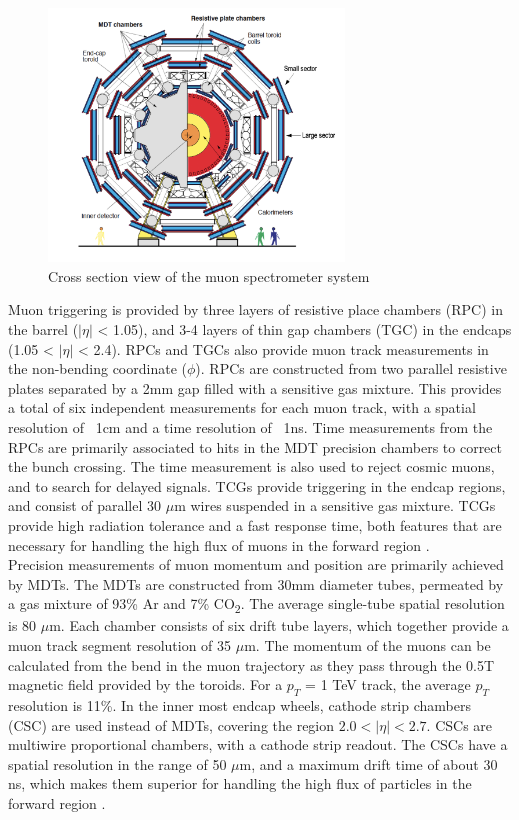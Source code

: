 \begin{figure}
        \centering
	\includegraphics[width=0.7\textwidth]{figures/ch3/muonSpec.png}
	\caption{Cross section view of the muon spectrometer system \cite{muon_tdr} }
	\label{fig:muonSpec}
\end{figure}
Muon triggering is provided by three layers of resistive place chambers (RPC) in the barrel ($|\eta|$ < 1.05), and 3-4 layers of thin gap chambers (TGC) in the endcaps (1.05 < $|\eta|$ < 2.4). RPCs and TGCs also provide muon track measurements in the non-bending coordinate ($\phi$). RPCs are constructed from two parallel resistive plates separated by a 2mm gap filled with a sensitive gas mixture. This provides a total of six independent measurements for each muon track, with a spatial resolution of ~1cm and a time resolution of ~1ns. Time measurements from the RPCs are primarily associated to hits in the MDT precision chambers to correct the bunch crossing. The time measurement is also used to reject cosmic muons, and to search for delayed signals. TCGs provide triggering in the endcap regions, and consist of parallel 30 $\mu$m wires suspended in a sensitive gas mixture. TCGs provide high radiation tolerance and a fast response time, both features that are necessary for handling the high flux of muons in the forward region \cite{muon_tdr}.\\

Precision measurements of muon momentum and position are primarily achieved by MDTs. The MDTs are constructed from 30mm diameter tubes, permeated by a gas mixture of 93\% Ar and 7\% CO\textsubscript{2}. The average single-tube spatial resolution is 80 $\mu$m. Each chamber consists of six drift tube layers, which together provide a muon track segment resolution of 35 $\mu$m. The momentum of the muons can be calculated from the bend in the muon trajectory as they pass through the 0.5T magnetic field provided by the toroids. For a $p_T$ = 1 TeV track, the average $p_T$ resolution is 11\%. In the inner most endcap wheels, cathode strip chambers (CSC) are used instead of MDTs, covering the region $2.0 < |\eta| < 2.7$. CSCs are multiwire proportional chambers, with a cathode strip readout. The CSCs have a spatial resolution in the range of 50 $\mu$m, and a maximum drift time of about 30 ns, which makes them superior for handling the high flux of particles in the forward region \cite{muon_spec}. 

